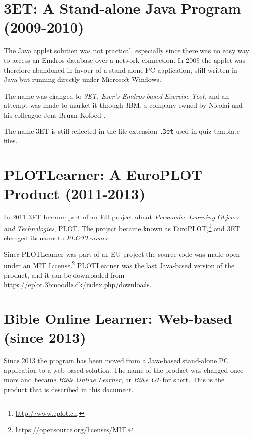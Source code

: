 \documentclass[11pt,oneside,a4paper]{memoir}
\begin{document}
\section{3ET: A Stand-alone Java Program (2009-2010)}

The Java applet solution was not practical, especially since there was no easy way to access an
Emdros database over a network connection. In 2009 the applet was therefore abandoned in favour of a
stand-alone PC application, still written in Java but running directly under Microsoft Windows.

The name was changed to \emph{3ET,} \emph{Ezer's Emdros-based Exercise Tool}, and an attempt was made to
market it through 3BM, a company owned by Nicolai and his colleague Jens Bruun Kofoed%
.

The name 3ET is still reflected in the file extension \texttt{.3et}
used in quiz template files.

\section{PLOTLearner: A EuroPLOT Product (2011-2013)}

In 2011 3ET became part of an EU project about \emph{Persuasive Learning Objects and Technologies},
PLOT. The project became known as EuroPLOT,\footnote{\url{http://www.eplot.eu}.} and
3ET changed its name to \emph{PLOTLearner.}

Since PLOTLearner was part of an EU project the source code was made open under an MIT
License.\footnote{\url{https://opensource.org/licenses/MIT}.} PLOTLearner was the last Java-based
version of the product, and it can be downloaded from
\url{https://eplot.3bmoodle.dk/index.php/downloads}.

\section{Bible Online Learner: Web-based (since 2013)}

Since 2013 the program has been moved from a Java-based stand-alone PC application to a web-based
solution. The name of the product was changed once more and became \emph{Bible Online Learner},
or \emph{Bible OL} for short. This is the product that is described in this document.
\end{document}

